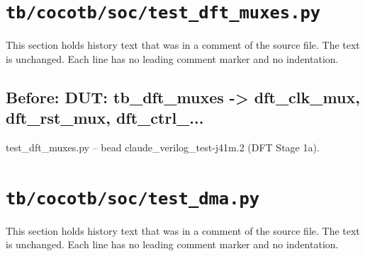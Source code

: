 \section{\texttt{tb/cocotb/soc/test\_dft\_muxes.py}}\label{cr:suite:soc-test-dft-muxes}

This section holds history text that was in a comment of the source file. The text is unchanged. Each line has no leading comment marker and no indentation.

\begin{record}

\subsection*{Before: DUT: tb\_dft\_muxes -> dft\_clk\_mux, dft\_rst\_mux, dft\_ctrl\_...}

\begin{textblock}
test_dft_muxes.py -- bead claude_verilog_test-j41m.2 (DFT Stage 1a).
\end{textblock}

\end{record}

\section{\texttt{tb/cocotb/soc/test\_dma.py}}\label{cr:suite:soc-test-dma}

This section holds history text that was in a comment of the source file. The text is unchanged. Each line has no leading comment marker and no indentation.

